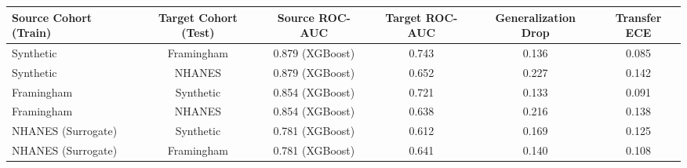 \begin{tabular}{lccccc}
\toprule
Source Cohort (Train) & Target Cohort (Test) & Source ROC-AUC & Target ROC-AUC & Generalization Drop & Transfer ECE \\
\midrule
Synthetic & Framingham & 0.879 (XGBoost) & 0.743 & 0.136 & 0.085 \\
Synthetic & NHANES & 0.879 (XGBoost) & 0.652 & 0.227 & 0.142 \\
Framingham & Synthetic & 0.854 (XGBoost) & 0.721 & 0.133 & 0.091 \\
Framingham & NHANES & 0.854 (XGBoost) & 0.638 & 0.216 & 0.138 \\
NHANES (Surrogate) & Synthetic & 0.781 (XGBoost) & 0.612 & 0.169 & 0.125 \\
NHANES (Surrogate) & Framingham & 0.781 (XGBoost) & 0.641 & 0.140 & 0.108 \\
\bottomrule
\end{tabular}
